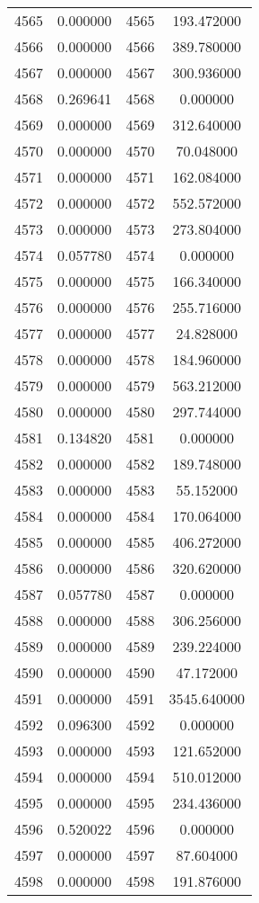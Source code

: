 \documentclass[12pt]{article}
\begin{document}
\begin{longtable}{@{}cccc@{}}
4565 & 0.000000 & 4565 & 193.472000 \\
4566 & 0.000000 & 4566 & 389.780000 \\
4567 & 0.000000 & 4567 & 300.936000 \\
4568 & 0.269641 & 4568 & 0.000000 \\
4569 & 0.000000 & 4569 & 312.640000 \\
4570 & 0.000000 & 4570 & 70.048000 \\
4571 & 0.000000 & 4571 & 162.084000 \\
4572 & 0.000000 & 4572 & 552.572000 \\
4573 & 0.000000 & 4573 & 273.804000 \\
4574 & 0.057780 & 4574 & 0.000000 \\
4575 & 0.000000 & 4575 & 166.340000 \\
4576 & 0.000000 & 4576 & 255.716000 \\
4577 & 0.000000 & 4577 & 24.828000 \\
4578 & 0.000000 & 4578 & 184.960000 \\
4579 & 0.000000 & 4579 & 563.212000 \\
4580 & 0.000000 & 4580 & 297.744000 \\
4581 & 0.134820 & 4581 & 0.000000 \\
4582 & 0.000000 & 4582 & 189.748000 \\
4583 & 0.000000 & 4583 & 55.152000 \\
4584 & 0.000000 & 4584 & 170.064000 \\
4585 & 0.000000 & 4585 & 406.272000 \\
4586 & 0.000000 & 4586 & 320.620000 \\
4587 & 0.057780 & 4587 & 0.000000 \\
4588 & 0.000000 & 4588 & 306.256000 \\
4589 & 0.000000 & 4589 & 239.224000 \\
4590 & 0.000000 & 4590 & 47.172000 \\
4591 & 0.000000 & 4591 & 3545.640000 \\
4592 & 0.096300 & 4592 & 0.000000 \\
4593 & 0.000000 & 4593 & 121.652000 \\
4594 & 0.000000 & 4594 & 510.012000 \\
4595 & 0.000000 & 4595 & 234.436000 \\
4596 & 0.520022 & 4596 & 0.000000 \\
4597 & 0.000000 & 4597 & 87.604000 \\
4598 & 0.000000 & 4598 & 191.876000 \\

\end{longtable}
\end{document}
